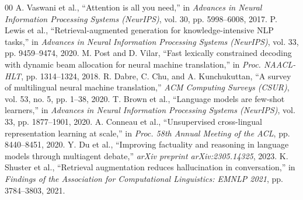 \documentclass[conference]{IEEEtran}
\begin{document}
\begin{thebibliography}{00}
 A. Vaswani et al., ``Attention is all you need,'' in \textit{Advances in Neural Information Processing Systems (NeurIPS)}, vol. 30, pp. 5998--6008, 2017.
 P. Lewis et al., ``Retrieval-augmented generation for knowledge-intensive NLP tasks,'' in \textit{Advances in Neural Information Processing Systems (NeurIPS)}, vol. 33, pp. 9459--9474, 2020.
 M. Post and D. Vilar, ``Fast lexically constrained decoding with dynamic beam allocation for neural machine translation,'' in \textit{Proc. NAACL-HLT}, pp. 1314--1324, 2018.
 R. Dabre, C. Chu, and A. Kunchukuttan, ``A survey of multilingual neural machine translation,'' \textit{ACM Computing Surveys (CSUR)}, vol. 53, no. 5, pp. 1--38, 2020.
 T. Brown et al., ``Language models are few-shot learners,'' in \textit{Advances in Neural Information Processing Systems (NeurIPS)}, vol. 33, pp. 1877--1901, 2020.
 A. Conneau et al., ``Unsupervised cross-lingual representation learning at scale,'' in \textit{Proc. 58th Annual Meeting of the ACL}, pp. 8440--8451, 2020.
 Y. Du et al., ``Improving factuality and reasoning in language models through multiagent debate,'' \textit{arXiv preprint arXiv:2305.14325}, 2023.
 K. Shuster et al., ``Retrieval augmentation reduces hallucination in conversation,'' in \textit{Findings of the Association for Computational Linguistics: EMNLP 2021}, pp. 3784--3803, 2021.
\end{thebibliography}
\end{document}
